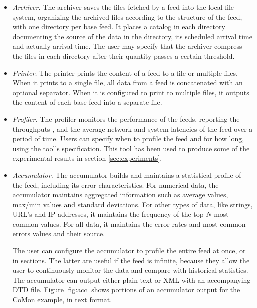 \begin{itemize}
\item {\em Archiver.} The archiver saves the files fetched by a feed into the local file system, organizing the archived files
according to the structure of the feed, with one directory per base feed. 
It places a catalog in each directory documenting the source of 
the data in the directory, its scheduled arrival time and
actually arrival time. The user may specify that the archiver compress
the files in each directory after their quantity passes a certain threshold. 

\item {\em Printer.} The printer prints the content of a feed to a file or
multiple files. When it prints to a single file, all data from a feed is
concatenated with an optional separator. When it is configured to print
to multiple files, it outputs the content of each base feed into a separate
file.

\item {\em Profiler.} The profiler monitors the performance of the feeds, reporting the throughputs ,  and the average network and system latencies
of the feed over a period of time. Users can specify when to profile the feed and
for how long, using the tool's specification. This tool has been used to produce
some of the experimental results in section \ref{sec:experiments}.

\item {\em Accumulator.} The accumulator builds and maintains a statistical profile of the feed, including its error characteristics. For numerical data, the accumulator maintains aggregated information such as 
average values, max/min values and standard deviations. For other
types of data, like strings, URL's and IP addresses, it maintains the frequency of the top $N$
most common values. For all data, it maintains the error rates and most common errors values and their source.

The user can configure the accumulator to profile the entire feed at once, or in sections. The latter are
useful if the feed is infinite, because they allow the user to continuously monitor the data and compare with historical statistics. 
The accumulator can output either plain text or XML with an
accompanying DTD file. Figure \ref{fig:acc} shows portions of an accumulator
output for the CoMon example, in text format.


\end{itemize}
